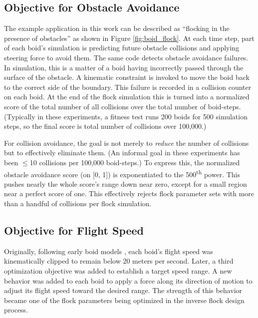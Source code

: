 \documentclass[letterpaper]{article}
\begin{document}


\subsection{Objective for Obstacle Avoidance}
\label{subsec:avoidance_objective}

The example application in this work can be described as ``flocking in the presence of obstacles'' as shown in Figure \ref{fig:boid_flock}. At each time step, part of each boid's simulation is predicting future obstacle collisions and applying steering force to avoid them. The same code detects obstacle avoidance failures. In simulation, this is a matter of a boid having incorrectly passed through the surface of the obstacle. A kinematic constraint is invoked to move the boid back to the correct side of the boundary. This failure is recorded in a collision counter on each boid. At the end of the flock simulation this is turned into a normalized score of the total number of all collisions over the total number of boid-steps. (Typically in these experiments, a fitness test runs 200 boids for 500 simulation steps, so the final score is total number of collisions over 100,000.) 

For collision avoidance, the goal is not merely to \textit{reduce} the number of collisions but to effectively eliminate them. (An informal goal in these experiments has been {$\leq$}10 collisions per 100,000 boid-steps.) To express this, the normalized obstacle avoidance score (on [0, 1]) is exponentiated to the 500\textsuperscript{th} power. This pushes nearly the whole score's range down near zero, except for a small region near a perfect score of one. This effectively rejects flock parameter sets with more than a handful of collisions per flock simulation.

\subsection{Objective for Flight Speed}
\label{subsec:speed_objective}

Originally, following early boid models \citep{reynolds_flocks_1987}, each boid's flight speed was kinematically clipped to remain below 20 meters per second. Later, a third optimization objective was added to establish a target speed range. A new behavior was added to each boid to apply a force along its direction of motion to adjust its flight speed toward the desired range. The strength of this behavior became one of the flock parameters being optimized in the inverse flock design process.
\end{document}
